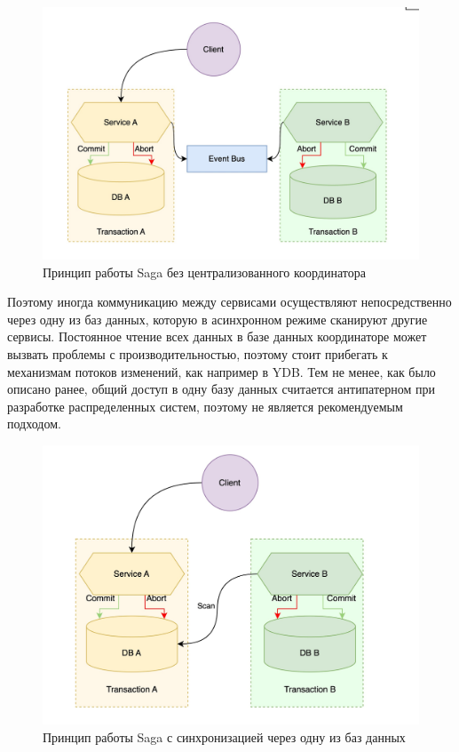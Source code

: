 \begin{figure}[H]
    \centering
    \includegraphics[width=0.8\linewidth]{img/saga_async.jpeg}
    \caption{Принцип работы Saga без централизованного координатора}
    \label{fig:saga_async}
\end{figure}

Поэтому иногда коммуникацию между сервисами осуществляют непосредственно через одну из баз данных, которую в асинхронном режиме
сканируют другие сервисы. Постоянное чтение всех данных в базе данных координаторе может вызвать проблемы с производительностью, поэтому 
стоит прибегать к механизмам потоков изменений, как например в YDB. Тем не менее, как было описано ранее, общий доступ в одну базу данных
считается антипатерном при разработке распределенных систем, поэтому не является рекомендуемым подходом.

\begin{figure}[H]
    \centering
    \includegraphics[width=0.8\linewidth]{img/saga_scan.jpeg}
    \caption{Принцип работы Saga с синхронизацией через одну из баз данных}
    \label{fig:saga_db}
\end{figure}

